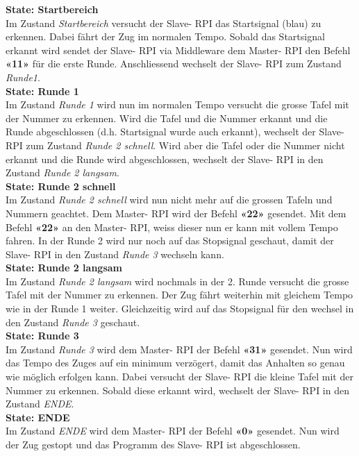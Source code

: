 \documentclass[../../main.tex]{subfiles}
\begin{document}
\textbf{State: Startbereich}\\
Im Zustand \textit{Startbereich} versucht der Slave- RPI das Startsignal (blau) zu erkennen. Dabei fährt der Zug im normalen Tempo. Sobald das Startsignal erkannt wird sendet der Slave- RPI via Middleware dem Master- RPI den Befehl \textbf{«11»} für die erste Runde. Anschliessend wechselt der Slave- RPI zum Zustand \textit{Runde1}.\\

\textbf{State: Runde 1}\\
Im Zustand \textit{Runde 1} wird nun im normalen Tempo versucht die grosse Tafel mit der Nummer zu erkennen. Wird die Tafel und die Nummer erkannt und die Runde abgeschlossen (d.h. Startsignal wurde auch erkannt), wechselt der Slave- RPI zum Zustand \textit{Runde 2 schnell}. Wird aber die Tafel oder die Nummer nicht erkannt und die Runde wird abgeschlossen, wechselt der Slave- RPI in den Zustand \textit{Runde 2 langsam}.\\

\textbf{State: Runde 2 schnell}\\
Im Zustand \textit{Runde 2 schnell} wird nun nicht mehr auf die grossen Tafeln und Nummern geachtet. Dem Master- RPI wird der Befehl \textbf{«22»} gesendet. Mit dem Befehl \textbf{«22»} an den Master- RPI, weiss dieser nun er kann mit vollem Tempo fahren. In der Runde 2 wird nur noch auf das Stopsignal geschaut, damit der Slave- RPI in den Zustand \textit{Runde 3} wechseln kann.\\

\textbf{State: Runde 2 langsam}\\
Im Zustand \textit{Runde 2 langsam} wird nochmals in der 2. Runde versucht die grosse Tafel mit der Nummer zu erkennen. Der Zug fährt weiterhin mit gleichem Tempo wie in der Runde 1 weiter. Gleichzeitig wird auf das Stopsignal für den wechsel in den Zustand \textit{Runde 3} geschaut.\\

\textbf{State: Runde 3}\\
Im Zustand \textit{Runde 3} wird dem Master- RPI der Befehl \textbf{«31»} gesendet. Nun wird das Tempo des Zuges auf ein minimum verzögert, damit das Anhalten so genau wie möglich erfolgen kann. Dabei versucht der Slave- RPI die kleine Tafel mit der Nummer zu erkennen. Sobald diese erkannt wird, wechselt der Slave- RPI in den Zustand \textit{ENDE}.\\

\textbf{State: ENDE}\\
Im Zustand \textit{ENDE} wird dem Master- RPI der Befehl \textbf{«0»} gesendet. Nun wird der Zug gestopt und das Programm des Slave- RPI ist abgeschlossen.
\end{document}
